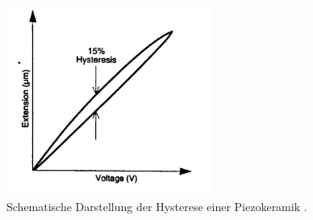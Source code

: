 \begin{figure}[h]
  \centering
  \includegraphics[width=0.6\textwidth]{./pics/hysterese.png}
  \caption{Schematische Darstellung der Hysterese einer Piezokeramik \cite{rtm}.}
  \label{fig: hysterese}
\end{figure}

